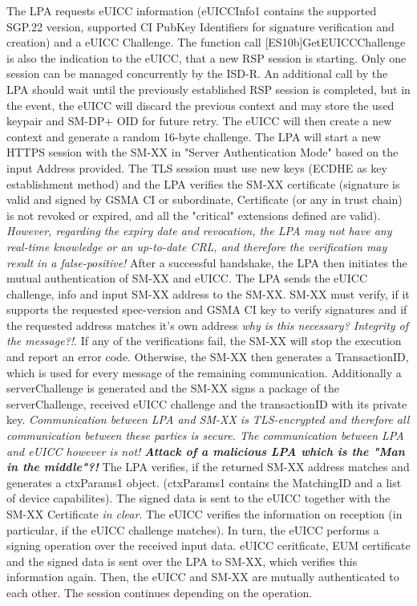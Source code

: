 The LPA requests eUICC information (eUICCInfo1 contains the supported SGP.22 version, supported CI PubKey Identifiers for signature verification and creation) and a eUICC Challenge. The function call [ES10b]GetEUICCChallenge is also the indication to the eUICC, that a new RSP session is starting. Only one session can be managed concurrently by the ISD-R. An additional call by the LPA should wait until the previously established RSP session is completed, but in the event, the eUICC will discard the previous context and may store the used keypair and SM-DP+ OID for future retry. The eUICC will then create a new context and generate a random 16-byte challenge.
The LPA will start a new HTTPS session with the SM-XX in "Server Authentication Mode" based on the input Address provided. The TLS session must use new keys (ECDHE as key establishment method) and the LPA verifies the SM-XX certificate (signature is valid and signed by GSMA CI or subordinate, Certificate (or any in trust chain) is not revoked or expired, and all the "critical" extensions defined are valid). \textit{However, regarding the expiry date and revocation, the LPA may not have any real-time knowledge or an up-to-date CRL, and therefore the verification may result in a false-positive!}
After a successful handshake, the LPA then initiates the mutual authentication of SM-XX and eUICC. The LPA sends the eUICC challenge, info and input SM-XX address to the SM-XX. SM-XX must verify, if it supports the requested spec-version and GSMA CI key to verify signatures and if the requested address matches it's own address \textit{why is this necessary? Integrity of the message?!}. If any of the verifications fail, the SM-XX will stop the execution and report an error code. Otherwise, the SM-XX then generates a TransactionID, which is used for every message of the remaining communication. Additionally a serverChallenge is generated and the SM-XX signs a package of the serverChallenge, received eUICC challenge and the transactionID with its private key. \textit{Communication between LPA and SM-XX is TLS-encrypted and therefore all communication between these parties is secure. The communication between LPA and eUICC however is not! \textbf{Attack of a malicious LPA which is the "Man in the middle"?!}} The LPA verifies, if the returned SM-XX address matches and generates a ctxParams1 object. (ctxParams1 contains the MatchingID and a list of device capabilites). The signed data is sent to the eUICC together with the SM-XX Certificate \textit{in clear}. The eUICC verifies the information on reception (in particular, if the eUICC challenge matches). In turn, the eUICC performs a signing operation over the received input data. eUICC ceritficate, EUM certificate and the signed data is sent over the LPA to SM-XX, which verifies this information again. Then, the eUICC and SM-XX are mutually authenticated to each other. The session continues depending on the operation.

